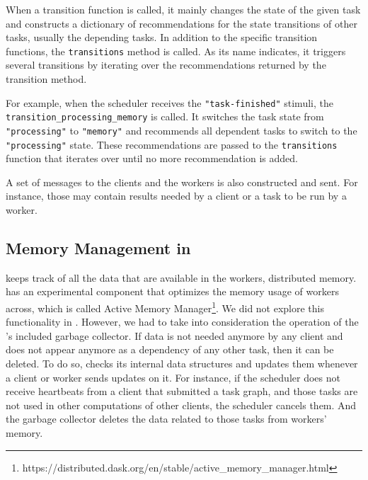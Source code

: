 When a transition function is called, it mainly changes the state of the given task and constructs a dictionary of recommendations for the state transitions of other tasks, usually the depending tasks. In addition to the specific transition functions, the \texttt{transitions} method is called. As its name indicates, it triggers several transitions by iterating over the recommendations returned by the transition method. 

For example, when the scheduler receives the \texttt{"task-finished"} stimuli, the \texttt{transition\_processing\_memory} is called. It switches the task state from \texttt{"processing"} to \texttt{"memory"} and recommends all dependent tasks to switch to the \texttt{"processing"} state. These recommendations are passed to the \texttt{transitions} function that iterates over until no more recommendation is added.

A set of messages to the clients and the workers is also constructed and sent. For instance, those may contain results needed by a client or a task to be run by a worker.

\subsection{Memory Management in \dask}
\dask keeps track of all the data that are available in the workers, distributed memory. \dask has an experimental component that optimizes the memory usage of workers across, which is called Active Memory Manager\footnote{https://distributed.dask.org/en/stable/active\_memory\_manager.html}. 
We did not explore this functionality in \dask. However, we had to take into consideration the operation of the \dask's included garbage collector. 
If data is not needed anymore by any client and does not appear anymore as a dependency of any other task, then it can be deleted. To do so, \dask checks its internal data structures and updates them whenever a client or worker sends updates on it. 
For instance, if the scheduler does not receive heartbeats from a client that submitted a task graph, and those tasks are not used in other computations of other clients, the scheduler cancels them. And the garbage collector deletes the data related to those tasks from workers' memory.  

